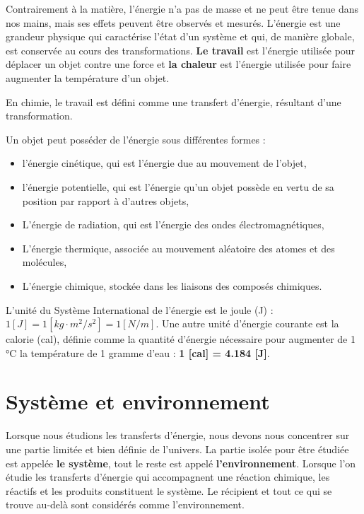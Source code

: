\documentclass[
  11pt,
  a4paper,
  openany]{book}
\providecommand{\tightlist}{%
  \setlength{\itemsep}{0pt}\setlength{\parskip}{0pt}}
\begin{document}
Contrairement à la matière, l'énergie n'a pas de masse et ne peut être tenue dans nos mains, mais ses effets peuvent être observés et mesurés. L'énergie est une grandeur physique qui caractérise l'état d'un système et qui, de manière globale, est conservée au cours des transformations. \textbf{Le travail} est l'énergie utilisée pour déplacer un objet contre une force et \textbf{la chaleur} est l'énergie utilisée pour faire augmenter la température d'un objet.

En chimie, le travail est défini comme une transfert d'énergie, résultant d'une transformation.

\clearpage

Un objet peut posséder de l'énergie sous différentes formes :

\begin{itemize}
\tightlist
\item
  l'énergie cinétique, qui est l'énergie due au mouvement de l'objet,
\item
  l'énergie potentielle, qui est l'énergie qu'un objet possède en vertu de sa position par rapport à d'autres objets,
\item
  L'énergie de radiation, qui est l'énergie des ondes électromagnétiques,
\item
  L'énergie thermique, associée au mouvement aléatoire des atomes et des molécules,
\item
  L'énergie chimique, stockée dans les liaisons des composés chimiques.
\end{itemize}

L'unité du Système International de l'énergie est le joule (J) : \(1 [J] = 1 [kg \cdot m^2 / s^2] = 1 [N/m]\). Une autre unité d'énergie courante est la calorie (cal), définie comme la quantité d'énergie nécessaire pour augmenter de 1 °C la température de 1 gramme d'eau : \textbf{1 {[}cal{]} = 4.184 {[}J{]}}.

\hypertarget{systuxe8me-et-environnement}{%
\section{Système et environnement}\label{systuxe8me-et-environnement}}

Lorsque nous étudions les transferts d'énergie, nous devons nous concentrer sur une partie limitée et bien définie de l'univers. La partie isolée pour être étudiée est appelée \textbf{le système}, tout le reste est appelé \textbf{l'environnement}. Lorsque l'on étudie les transferts d'énergie qui accompagnent une réaction chimique, les réactifs et les produits constituent le système. Le récipient et tout ce qui se trouve au-delà sont considérés comme l'environnement.
\end{document}
